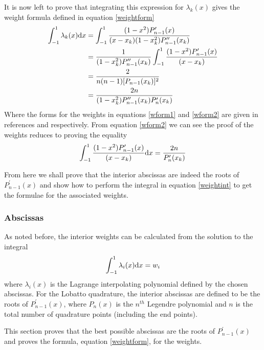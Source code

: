 \documentclass[preprint]{revtex4}
\newcommand{\dx}{{\rm d}x}
\newcommand{\intunit}{\ensuremath{\int_{-1}^{1}}}
\begin{document}
It is now left to prove that integrating this expression for $\lambda_k(x)$ gives
the weight formula defined in equation \ref{weightform}
\begin{align}
\intunit \lambda_k(x)\dx & = \intunit \frac{(1-x^2)P^\prime_{n-1}(x)}{(x-x_k)(1-x_k^2)P_{n-1}^{\prime\prime}(x_k)} \nonumber \\
 & = \frac{1}{(1-x_k^2)P^{\prime\prime}_{n-1}(x_k)} \intunit \frac{(1-x^2)P^\prime_{n-1}(x)}{(x-x_k)} \nonumber \\
\label{wform1}
 & = \frac{2}{n(n-1)[P_{n-1}(x_k)]^2} \\
\label{wform2}
 & = \frac{2n}{(1-x_k^2)P^{\prime\prime}_{n-1}(x_k)P^\prime_n(x_k)} 
\end{align}
Where the forms for the weights in equations \ref{wform1}  and \ref{wform2} are given in references
\cite{ABRW-STGN} and \cite{LobattoQuad} respectively. 
From equation \ref{wform2} we can see the proof of the weights reduces to proving the equality
\begin{equation}
\label{weightint}
\intunit \frac{(1-x^2)P^\prime_{n-1}(x)}{(x-x_k)}\dx = \frac{2n}{P^\prime_n(x_k)}
\end{equation}

From here we shall prove that the interior abscissas are indeed the roots of $P_{n-1}^\prime(x)$
and show how to perform the integral in equation \ref{weightint} to get the formulae for 
the associated weights.

\subsubsection{Abscissas}
As noted before, the interior weights can be calculated from the solution
to the integral
\begin{equation}
\intunit \lambda_i(x)\dx = w_i
\end{equation}
where $\lambda_i(x)$ is the Lagrange interpolating polynomial defined by the 
chosen abscissas. For the Lobatto quadrature, the interior abscissas are defined
to be the roots of $P^\prime_{n-1}(x)$, where $P_n(x)$ is the $n^{th}$ Legendre 
polynomial and $n$ is the total number of quadrature points (including the end points). 

This section proves that the best possible abscissas are the roots of $P^\prime_{n-1}(x)$
and proves the formula, equation \ref{weightform}, for the weights. 
\end{document}
